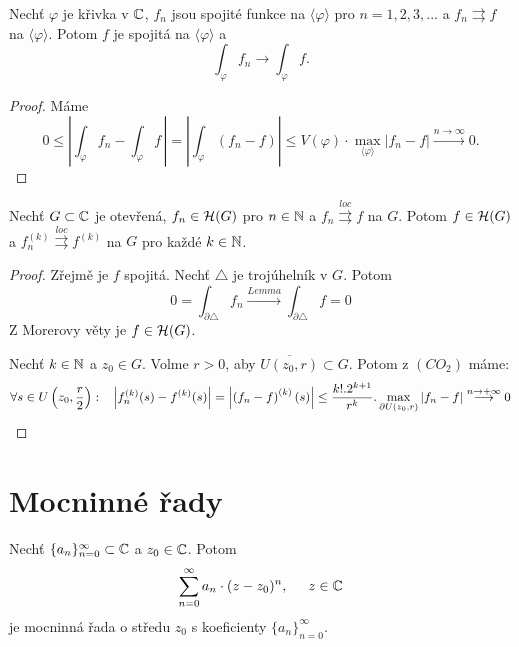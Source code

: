 \begin{lemma}
Nechť $\varphi$ je křivka v $\operatorname{\mathbb{C}}  $, $f_n$ jsou spojité funkce na $\langle\varphi\rangle$ pro $n=1,2,3,...$ a $f_n\rightrightarrows{f}$ na $\langle\varphi\rangle$. Potom $f$ je spojitá na $\langle\varphi\rangle$ a 
\[\int_\varphi{f_n}\longrightarrow\int_\varphi{f}.\]
\end{lemma}

\begin{proof}
Máme
\[0\leq\left\lvert{\int_\varphi{f_n}-\int_\varphi{f}}\, \right\lvert=
\left\lvert{\int_\varphi{(f_n-f)}}\right\lvert\leq{}
V(\varphi)\cdot\max_{\langle\varphi\rangle}{|f_n-f|}\overset{n\to\infty}{\longrightarrow}0.\]
\end{proof}

\begin{theorem}[Weierstrass]\label{thm:weierstrass}
Nechť $G\subset{\operatorname{\mathbb{C}}}$ je otevřená, $f_n\in\operatorname{\mathcal{H}} (G)$ pro $n\in\operatorname{\mathbb{N}}$ a $f_n\overset{loc}{\rightrightarrows}f$ na $G$. Potom $f\in\operatorname{\mathcal{H}} (G)$ a $f_n^{(k)}\overset{loc}{\rightrightarrows}f^{(k)}$ na $G$ pro každé $k\in\operatorname{\mathbb{N}}$.
\end{theorem}

\begin{proof}
 Zřejmě je $f$ spojitá. Nechť $\triangle$ je trojúhelník v $G$. Potom 
\[0=\int_{\partial\triangle}{f_n}\overset{Lemma}{\longrightarrow}
\int_{\partial\triangle}{f}=0\]
Z Morerovy věty je $f\in\operatorname{\mathcal{H}} (G)$.

 Nechť $k\in\operatorname{\mathbb{N}}$ a $z_0\in{G}$. Volme $r>0$, aby $\overline{U(z_0,r)}\subset{G}$. Potom z $(CO_2)$ máme:
\[\forall{s\in{U\left(z_0,\frac{r}{2}\right)}}:\hspace{3mm}
{\left\lvert{f_n^{(k)}(s)-f^{(k)}(s)}\right\lvert}=
\left\lvert{\left({f_n-f}\right)^{(k)}(s)}\right\lvert\leq
\frac{k!.2^{k+1}}{r^k}.\max_{\partial{U(z_0,r)}}{|f_n-f|}
\overset{n\to+\infty}{\longrightarrow}0\]
\end{proof}

\section{\texorpdfstring{Mocninné řady}{Mocninné rady}}
\setcounter{equation}{0}
\begin{definition}
Nechť $\{a_n\}_{n=0}^\infty\subset\operatorname{\mathbb{C}}  $ a $z_0\in\operatorname{\mathbb{C}}  $. Potom 
\begin{equation}
\sum_{n=0}^\infty{a_n\cdot(z-z_0)^n}, \hspace{5mm} z\in\operatorname{\mathbb{C}}  
\label{eqn:rada}
\end{equation}
je mocninná řada o středu $z_0$ s koeficienty $\{a_n\}_{n=0}^\infty$.
\end{definition}

